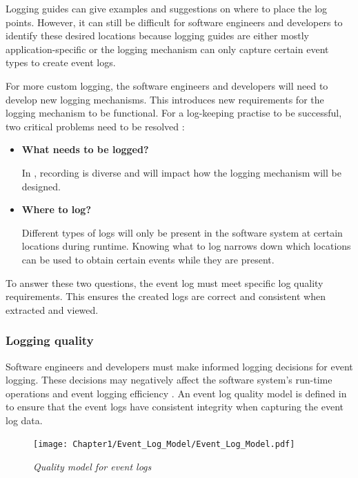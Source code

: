 Logging guides can give examples and suggestions on where to place the log points. However, it can still be difficult for software engineers and developers to identify these desired locations because logging guides are either mostly application-specific or the logging mechanism can only capture certain event types to create event logs. \par For more custom logging, the software engineers and developers will need to develop new logging mechanisms. This introduces new requirements for the logging mechanism to be functional. For a log-keeping practise to be successful, two critical problems need to be resolved \cite{Zhu2015, Zhu2019, Rong2018}:

\begin{itemize}
	\item \textbf{What needs to be logged?}\par In , recording is diverse and will impact how the logging mechanism will be designed.
	\item \textbf{Where to log?} \par Different types of logs will only be present in the software system at certain locations during runtime. Knowing what to log narrows down which locations can be used to obtain certain events while they are present.
\end{itemize}

To answer these two questions, the event log must meet specific log quality requirements. This ensures the created logs are correct and consistent when extracted and viewed. 

\subsubsection{Logging quality}\label{sec:ch1_loggingQuality}

Software engineers and developers must make informed logging decisions for event logging. These decisions may negatively affect the software system's run-time operations and event logging efficiency \cite{Zhu2015, Zhu2019, Kherbouche2017}. An event log quality model is defined in  to ensure that the event logs have consistent integrity when capturing the event log data.

\clearpage

\begin{figure}[!htb]
	\centering %
	\texttt{[image: Chapter1/Event\_Log\_Model/Event\_Log\_Model.pdf]}
	\caption[Quality model for event logs]
	{\textit{Quality model for event logs \cite{Kherbouche2017}}} \label{fig:ch1_EventQModel}
\end{figure}

